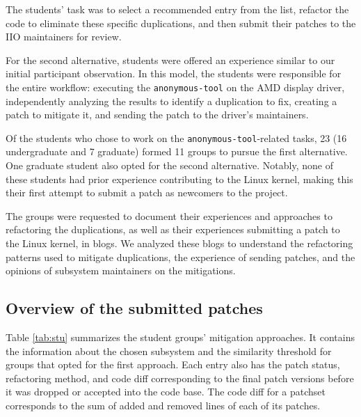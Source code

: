 \documentclass[10pt,conference]{IEEEtran}
\begin{document}
The students' task was to select a recommended entry from the list, refactor the code to eliminate these specific duplications, and then submit their patches to the IIO maintainers for review.

For the second alternative, students were offered an experience similar to our initial participant 
observation. In this model, the students were responsible for the entire workflow: executing the 
\texttt{anonymous-tool} on the AMD display driver, independently analyzing the results to identify a duplication 
to fix, creating a patch to mitigate it, and sending the patch to the driver's maintainers.

Of the students who chose to work on the \texttt{anonymous-tool}-related tasks, 23 (16 undergraduate and 7 graduate) 
formed 11 groups to pursue the first alternative. One graduate student also opted for the second alternative. Notably, none of these students had prior experience contributing to the Linux kernel, making this their first attempt to submit a patch as newcomers to the project.

The groups were requested to document their experiences and approaches to refactoring the duplications, as well as their experiences submitting a patch to the Linux kernel, in blogs. We analyzed these blogs to understand the refactoring patterns used to mitigate duplications, the experience of sending patches, and the opinions of subsystem maintainers on the mitigations.

\subsection{Overview of the submitted patches}

Table \ref{tab:stu} summarizes the student groups' mitigation approaches. It contains the information about the chosen subsystem and the similarity threshold for groups that opted for the first approach. Each entry also has the patch status, refactoring method, and code diff corresponding to the final patch versions before it was dropped or accepted into the code base. The code diff for a patchset corresponds to the sum of added and removed lines of each of its patches.
\end{document}
